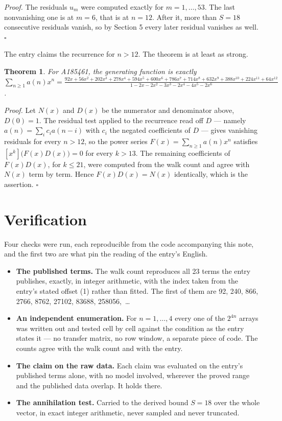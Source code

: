 \documentclass[11pt]{article}
\newtheorem{theorem}{Theorem}
\theoremstyle{definition}
\begin{document}
{\itshape Proof.} The residuals $u_m$ were computed exactly for $m = 1,\dots,53$. The last nonvanishing one is at $m = 6$, that is at $n = 12$. After it, more than $S = 18$ consecutive residuals vanish, so by Section 5 every later residual vanishes as well. $\square$

The entry claims the recurrence for $n > 12$. The theorem is at least as strong.

\begin{theorem} For A185461, the generating function is exactly $\sum_{n\ge 1} a(n)x^n = \frac{92x + 56x^{2} + 202x^{3} + 278x^{4} + 594x^{5} + 600x^{6} + 786x^{7} + 714x^{8} + 632x^{9} + 388x^{10} + 224x^{11} + 64x^{12}}{1 - 2x - 2x^{2} - 3x^{3} - 2x^{4} - 4x^{5} - 2x^{6}}$.\end{theorem}

{\itshape Proof.} Let $N(x)$ and $D(x)$ be the numerator and denominator above, $D(0)=1$. The residual test applied to the recurrence read off $D$ --- namely $a(n) = \sum_i c_i a(n-i)$ with $c_i$ the negated coefficients of $D$ --- gives vanishing residuals for every $n > 12$, so the power series $F(x)=\sum_{n\ge 1}a(n)x^n$ satisfies $[x^k]\bigl(F(x)D(x)\bigr) = 0$ for every $k > 13$. The remaining coefficients of $F(x)D(x)$, for $k \le 21$, were computed from the walk count and agree with $N(x)$ term by term. Hence $F(x)D(x) = N(x)$ identically, which is the assertion. $\square$

\section{Verification}

Four checks were run, each reproducible from the code accompanying this note, and the first two are what pin the reading of the entry's English.

\begin{itemize}

\item {\bfseries The published terms.} The walk count reproduces all 23 terms the entry publishes, exactly, in integer arithmetic, with the index taken from the entry's stated offset (1) rather than fitted. The first of them are 92, 240, 866, 2766, 8762, 27102, 83688, 258056,~\dots

\item {\bfseries An independent enumeration.} For $n = 1,\dots,4$ every one of the $2^{4n}$ arrays was written out and tested cell by cell against the condition as the entry states it --- no transfer matrix, no row window, a separate piece of code. The counts agree with the walk count and with the entry.

\item {\bfseries The claim on the raw data.} Each claim was evaluated on the entry's published terms alone, with no model involved, wherever the proved range and the published data overlap. It holds there.

\item {\bfseries The annihilation test.} Carried to the derived bound $S = 18$ over the whole vector, in exact integer arithmetic, never sampled and never truncated.

\end{itemize}
\end{document}
